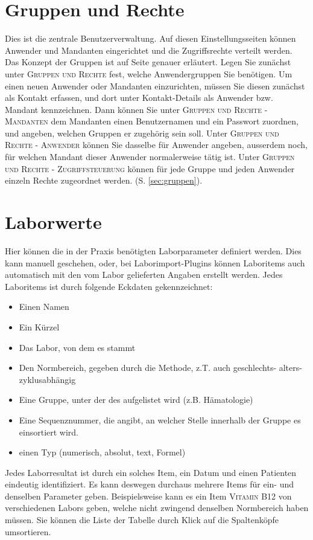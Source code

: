 \section{Gruppen und Rechte}
Dies ist die zentrale Benutzerverwaltung. Auf diesen Einstellungsseiten können Anwender und Mandanten eingerichtet und die Zugriffsrechte verteilt werden. Das Konzept der Gruppen ist auf Seite \pageref{sec:gruppen} genauer erläutert.
Legen Sie zunächst unter \textsc{Gruppen und Rechte} fest, welche Anwendergruppen Sie benötigen.
Um einen neuen Anwender oder Mandanten einzurichten, müssen Sie diesen zunächst als \glqq Kontakt \grqq{} erfassen, und dort unter Kontakt-Details als Anwender bzw. Mandant kennzeichnen. Dann können Sie unter \textsc{Gruppen und Rechte - Mandanten} dem Mandanten einen Benutzernamen und ein Passwort zuordnen, und angeben, welchen Gruppen er zugehörig sein soll.
Unter \textsc{Gruppen und Rechte - Anwender} können Sie dasselbe für Anwender angeben, ausserdem noch, für welchen Mandant dieser Anwender normalerweise tätig ist.
Unter \textsc{Gruppen und Rechte - Zugriffsteuerung} können für jede Gruppe und jeden Anwender einzeln Rechte zugeordnet werden.  (S. \ref{sec:gruppen}).
\section{Laborwerte}
\label{config:labor}
Hier können die in der Praxis benötigten Laborparameter definiert werden. Dies kann manuell geschehen, oder, bei Laborimport-Plugins können Laboritems auch automatisch mit den vom Labor gelieferten Angaben erstellt werden.
Jedes Laboritems ist durch folgende Eckdaten gekennzeichnet:
\begin{itemize}
\item{Einen Namen}
\item{Ein Kürzel}
\item{Das Labor, von dem es stammt}
\item{Den Normbereich, gegeben durch die Methode, z.T. auch geschlechts- alters- zyklusabhängig}
\item{Eine Gruppe, unter der des aufgelistet wird (z.B. Hämatologie)}
\item{Eine Sequenznummer, die angibt, an welcher Stelle innerhalb der Gruppe es einsortiert wird.}
\item{einen Typ (numerisch, absolut, text, Formel)}
\end{itemize}

Jedes Laborresultat ist durch ein solches Item, ein Datum und einen Patienten eindeutig identifiziert.
Es kann deswegen durchaus mehrere Items für ein- und denselben Parameter geben. Beispielsweise kann es ein Item \textsc{Vitamin B12} von verschiedenen Labors geben, welche nicht zwingend denselben Normbereich haben müssen.
Sie können die Liste der Tabelle durch Klick auf die Spaltenköpfe umsortieren.

